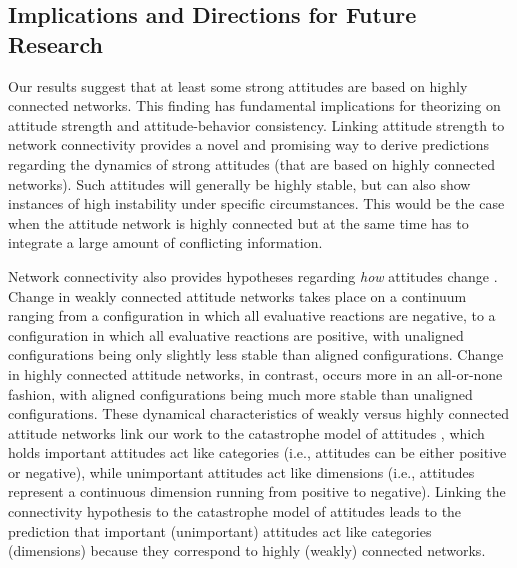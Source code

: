 \documentclass[10pt]{article}
\begin{document}
\begin{multicols}{2}
\subsection*{Implications and Directions for Future Research}
Our results suggest that at least some strong attitudes are based on highly connected networks. This finding has fundamental implications for theorizing on attitude strength and attitude-behavior consistency. Linking attitude strength to network connectivity provides a novel and promising way to derive predictions regarding the dynamics of strong attitudes (that are based on highly connected networks). Such attitudes will generally be highly stable, but can also show instances of high instability under specific circumstances. This would be the case when the attitude network is highly connected but at the same time has to integrate a large amount of conflicting information.\par
Network connectivity also provides hypotheses regarding \textit{how} attitudes change  \cite{Dalege2016}. Change in weakly connected attitude networks takes place on a continuum ranging from a configuration in which all evaluative reactions are negative, to a configuration in which all evaluative reactions are positive, with unaligned configurations being only slightly less stable than aligned configurations. Change in highly connected attitude networks, in contrast, occurs more in an all-or-none fashion, with aligned configurations being much more stable than unaligned configurations. These dynamical characteristics of weakly versus highly connected attitude networks link our work to the catastrophe model of attitudes \cite{Latane1994, vanderMaas2003, Zeeman1976}, which holds important attitudes act like categories (i.e., attitudes can be either positive or negative), while unimportant attitudes act like dimensions (i.e., attitudes represent a continuous dimension running from positive to negative). Linking the connectivity hypothesis to the catastrophe model of attitudes leads to the prediction that important (unimportant) attitudes act like categories (dimensions) because they correspond to highly (weakly) connected networks.\par

\end{multicols}
\end{document}
